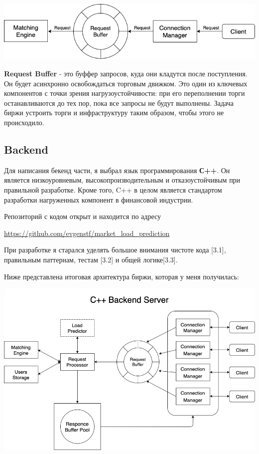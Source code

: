 \begin{center}
\includegraphics[width=400pt]{images/exchange_schema.png}
\end{center}


\textbf{Request Buffer} - это буффер запросов, куда они кладутся после поступления. Он будет асинхронно освобождаться торговым движком. Это один из ключевых компонентов с точки зрения нагрузоустойчивости: при его переполнении торги останавливаются до тех пор, пока все запросы не будут выполнены. Задача биржи устроить торги и инфраструктуру таким образом, чтобы этого не происходило.

\subsection{Backend}

Для написания бекенд части, я выбрал язык программирования \textbf{С++}. Он является низкоуровневым, высокопроизводительным и отказоустойчивым при правильной разработке. Кроме того, C++ в целом является стандартом разработки нагруженных компонент в финансовой индустрии.

Репозиторий с кодом открыт и находится по адресу

\begin{center} \url{https://github.com/evgenstf/market_load_prediction} \end{center}

При разработке я старался уделять большое внимания чистоте кода [3.1], правильным паттернам, тестам [3.2]  и общей логике[3.3].

Ниже представлена итоговая архитектура биржи, которая у меня получилась:


\begin{center}\includegraphics[width=450pt]{images/backend_schema.png}\end{center}

